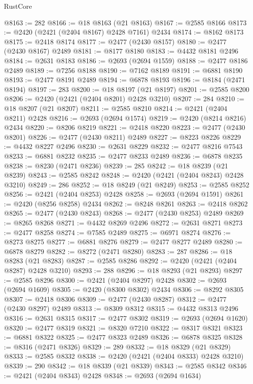 \begin{lexlean}{RustCore}
\begin{coremodule}
@8163 := 282
@8166 := @18 @8163 (@21 @8163)
@8167 := @2585 @8166
@8173 := @2420 (@2421 (@2404 @8167) @2428 @7161) @2434
@8174 := @8162 @8173
@8175 := @2418 @8174
@8177 := @2477 (@2430 @8157)
@8180 := @2477 (@2430 @8167) @2489
@8181 := @8177 @8180
@8183 := @4432 @8181 @2496
@8184 := @2631 @8183
@8186 := @2693 (@2694 @1559)
@8188 := @2477 @8186 @2489
@8189 := @7256 @8188
@8190 := @7162 @8189
@8191 := @6881 @8190
@8193 := @2477 @8191 @2489
@8194 := @6878 @8193
@8196 := @8184 (@2471 @8194)
@8197 := 283
@8200 := @18 @8197 (@21 @8197)
@8201 := @2585 @8200
@8206 := @2420 (@2421 (@2404 @8201) @2428 @3210)
@8207 := 284
@8210 := @18 @8207 (@21 @8207)
@8211 := @2585 @8210
@8214 := @2421 (@2404 @8211) @2428
@8216 := @2693 (@2694 @1574)
@8219 := @2420 (@8214 @8216) @2434
@8220 := @8206 @8219
@8221 := @2418 @8220
@8223 := @2477 (@2430 @8201)
@8226 := @2477 (@2430 @8211) @2489
@8227 := @8223 @8226
@8229 := @4432 @8227 @2496
@8230 := @2631 @8229
@8232 := @2477 @8216 @7543
@8233 := @6881 @8232
@8235 := @2477 @8233 @2489
@8236 := @6878 @8235
@8238 := @8230 (@2471 @8236)
@8239 := 285
@8242 := @18 @8239 (@21 @8239)
@8243 := @2585 @8242
@8248 := @2420 (@2421 (@2404 @8243) @2428 @3210)
@8249 := 286
@8252 := @18 @8249 (@21 @8249)
@8253 := @2585 @8252
@8256 := @2421 (@2404 @8253) @2428
@8258 := @2693 (@2694 @1591)
@8261 := @2420 (@8256 @8258) @2434
@8262 := @8248 @8261
@8263 := @2418 @8262
@8265 := @2477 (@2430 @8243)
@8268 := @2477 (@2430 @8253) @2489
@8269 := @8265 @8268
@8271 := @4432 @8269 @2496
@8272 := @2631 @8271
@8273 := @2477 @8258
@8274 := @7585 @2489
@8275 := @6971 @8274
@8276 := @8273 @8275
@8277 := @6881 @8276
@8279 := @2477 @8277 @2489
@8280 := @6878 @8279
@8282 := @8272 (@2471 @8280)
@8283 := 287
@8286 := @18 @8283 (@21 @8283)
@8287 := @2585 @8286
@8292 := @2420 (@2421 (@2404 @8287) @2428 @3210)
@8293 := 288
@8296 := @18 @8293 (@21 @8293)
@8297 := @2585 @8296
@8300 := @2421 (@2404 @8297) @2428
@8302 := @2693 (@2694 @1609)
@8305 := @2420 (@8300 @8302) @2434
@8306 := @8292 @8305
@8307 := @2418 @8306
@8309 := @2477 (@2430 @8287)
@8312 := @2477 (@2430 @8297) @2489
@8313 := @8309 @8312
@8315 := @4432 @8313 @2496
@8316 := @2631 @8315
@8317 := @2477 @8302
@8319 := @2693 (@2694 @1620)
@8320 := @2477 @8319
@8321 := @8320 @7210
@8322 := @8317 @8321
@8323 := @6881 @8322
@8325 := @2477 @8323 @2489
@8326 := @6878 @8325
@8328 := @8316 (@2471 @8326)
@8329 := 289
@8332 := @18 @8329 (@21 @8329)
@8333 := @2585 @8332
@8338 := @2420 (@2421 (@2404 @8333) @2428 @3210)
@8339 := 290
@8342 := @18 @8339 (@21 @8339)
@8343 := @2585 @8342
@8346 := @2421 (@2404 @8343) @2428
@8348 := @2693 (@2694 @1634)

\end{coremodule}
\end{lexlean}
